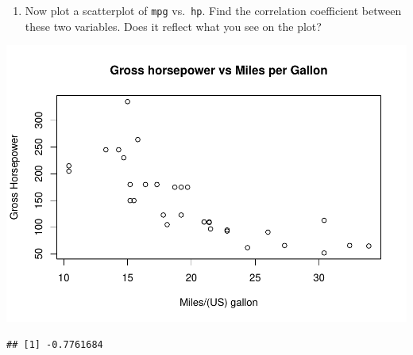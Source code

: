 \documentclass[
]{article}
\newenvironment{Shaded}{\begin{snugshade}}{\end{snugshade}}
\newcommand{\DataTypeTok}[1]{\textcolor[rgb]{0.13,0.29,0.53}{#1}}
\newcommand{\KeywordTok}[1]{\textcolor[rgb]{0.13,0.29,0.53}{\textbf{#1}}}
\newcommand{\NormalTok}[1]{#1}
\newcommand{\OperatorTok}[1]{\textcolor[rgb]{0.81,0.36,0.00}{\textbf{#1}}}
\newcommand{\StringTok}[1]{\textcolor[rgb]{0.31,0.60,0.02}{#1}}
\providecommand{\tightlist}{%
  \setlength{\itemsep}{0pt}\setlength{\parskip}{0pt}}
\begin{document}
\begin{enumerate}
\def\labelenumi{\arabic{enumi}.}
\setcounter{enumi}{1}
\tightlist
\item
  Now plot a scatterplot of \texttt{mpg} vs.~\texttt{hp}. Find the
  correlation coefficient between these two variables. Does it reflect
  what you see on the plot?
\end{enumerate}

\begin{Shaded}
\end{Shaded}

\includegraphics{CA2_DataAnalysis_files/figure-latex/unnamed-chunk-7-1.pdf}

\begin{Shaded}
\end{Shaded}

\begin{verbatim}
## [1] -0.7761684
\end{verbatim}
\end{document}
